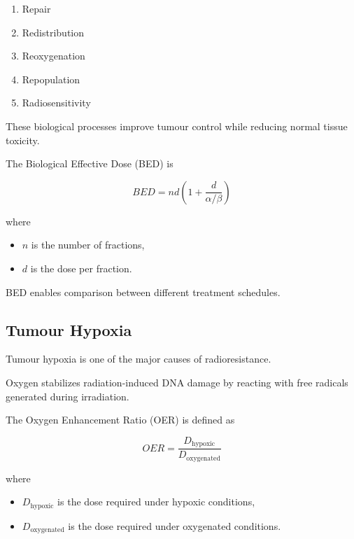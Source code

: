 \documentclass[12pt]{article}
\begin{document}
\begin{enumerate}
\item Repair
\item Redistribution
\item Reoxygenation
\item Repopulation
\item Radiosensitivity
\end{enumerate}

These biological processes improve tumour control while reducing normal tissue toxicity.

The Biological Effective Dose (BED) is

\begin{equation}
\boxed{
BED
=
nd
\left(
1+\frac{d}{\alpha/\beta}
\right)
}
\end{equation}

where

\begin{itemize}
\item $n$ is the number of fractions,
\item $d$ is the dose per fraction.
\end{itemize}

BED enables comparison between different treatment schedules.


\subsection{Tumour Hypoxia}

Tumour hypoxia is one of the major causes of radioresistance.

Oxygen stabilizes radiation-induced DNA damage by reacting with free radicals generated during irradiation.

The Oxygen Enhancement Ratio (OER) is defined as

\begin{equation}
\boxed{
OER
=
\frac{D_{\mathrm{hypoxic}}}
{D_{\mathrm{oxygenated}}}
}
\end{equation}

where

\begin{itemize}
\item $D_{\mathrm{hypoxic}}$ is the dose required under hypoxic conditions,
\item $D_{\mathrm{oxygenated}}$ is the dose required under oxygenated conditions.
\end{itemize}
\end{document}
